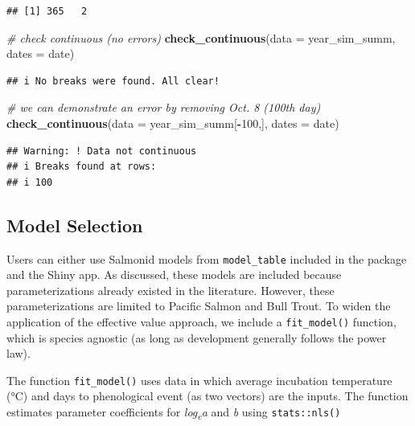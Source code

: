 \documentclass[10pt,a4paper,onecolumn]{article}
\newenvironment{Shaded}{\begin{snugshade}}{\end{snugshade}}
\newcommand{\AttributeTok}[1]{\textcolor[rgb]{0.13,0.29,0.53}{#1}}
\newcommand{\CommentTok}[1]{\textcolor[rgb]{0.56,0.35,0.01}{\textit{#1}}}
\newcommand{\DecValTok}[1]{\textcolor[rgb]{0.00,0.00,0.81}{#1}}
\newcommand{\FunctionTok}[1]{\textcolor[rgb]{0.13,0.29,0.53}{\textbf{#1}}}
\newcommand{\NormalTok}[1]{#1}
\newcommand{\SpecialCharTok}[1]{\textcolor[rgb]{0.81,0.36,0.00}{\textbf{#1}}}
\begin{document}
\begin{verbatim}
## [1] 365   2
\end{verbatim}

\begin{Shaded}
\begin{Highlighting}[]
\CommentTok{\# check continuous (no errors)}
\FunctionTok{check\_continuous}\NormalTok{(}\AttributeTok{data =}\NormalTok{ year\_sim\_summ,}
                 \AttributeTok{dates =}\NormalTok{ date)}
\end{Highlighting}
\end{Shaded}

\begin{verbatim}
## i No breaks were found. All clear!
\end{verbatim}

\begin{Shaded}
\begin{Highlighting}[]
\CommentTok{\# we can demonstrate an error by removing Oct. 8 (100th day)}
\FunctionTok{check\_continuous}\NormalTok{(}\AttributeTok{data =}\NormalTok{ year\_sim\_summ[}\SpecialCharTok{{-}}\DecValTok{100}\NormalTok{,],}
                 \AttributeTok{dates =}\NormalTok{ date)}
\end{Highlighting}
\end{Shaded}

\begin{verbatim}
## Warning: ! Data not continuous
## i Breaks found at rows:
## i 100
\end{verbatim}

\subsection{Model Selection}\label{model-selection}

Users can either use Salmonid models from \texttt{model\_table} included
in the package and the Shiny app. As discussed, these models are
included because parameterizations already existed in the literature.
However, these parameterizations are limited to Pacific Salmon and Bull
Trout. To widen the application of the effective value approach, we
include a \texttt{fit\_model()} function, which is species agnostic (as
long as development generally follows the power law).

The function \texttt{fit\_model()} uses data in which average incubation
temperature (°C) and days to phenological event (as two vectors) are the
inputs. The function estimates parameter coefficients for
\emph{log\textsubscript{e}a} and \emph{b} using \texttt{stats::nls()}
\end{document}
